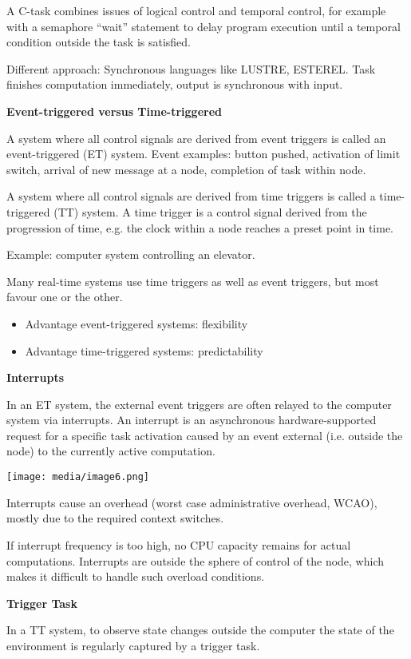 A C-task combines issues of logical control and temporal control, for
example with a semaphore ``wait'' statement to delay program execution
until a temporal condition outside the task is satisfied.

Different approach: Synchronous languages like LUSTRE, ESTEREL. Task
finishes computation immediately, output is synchronous with input.

\textbf{Event-triggered versus Time-triggered}

A system where all control signals are derived from event triggers is
called an event-triggered (ET) system. Event examples: button pushed,
activation of limit switch, arrival of new message at a node, completion
of task within node.

A system where all control signals are derived from time triggers is
called a time-triggered (TT) system. A time trigger is a control signal
derived from the progression of time, e.g. the clock within a node
reaches a preset point in time.

Example: computer system controlling an elevator.

Many real-time systems use time triggers as well as event triggers, but
most favour one or the other.

\begin{itemize}
\item
  Advantage event-triggered systems: flexibility
\item
  Advantage time-triggered systems: predictability
\end{itemize}

\textbf{Interrupts}

In an ET system, the external event triggers are often relayed to the
computer system via interrupts. An interrupt is an asynchronous
hardware-supported request for a specific task activation caused by an
event external (i.e. outside the node) to the currently active
computation.

\texttt{[image: media/image6.png]}

Interrupts cause an overhead (worst case administrative overhead, WCAO),
mostly due to the required context switches.

If interrupt frequency is too high, no CPU capacity remains for actual
computations. Interrupts are outside the sphere of control of the node,
which makes it difficult to handle such overload conditions.

\textbf{Trigger Task}

In a TT system, to observe state changes outside the computer the state
of the environment is regularly captured by a trigger task.

